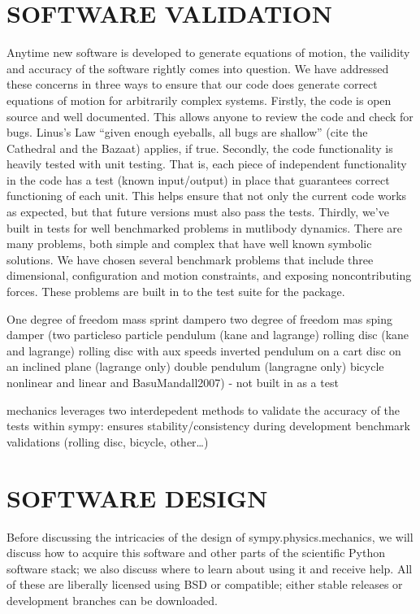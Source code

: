 \documentclass[twocolumn,10pt]{asme2e}
\begin{document}
\section*{SOFTWARE VALIDATION}
Anytime new software is developed to generate equations of motion, the
vailidity and accuracy of the software rightly comes into question. We have
addressed these concerns in three ways to ensure that our code does generate
correct equations of motion for arbitrarily complex systems. Firstly, the code
is open source and well documented. This allows anyone to review the code and
check for bugs. Linus's Law ``given enough eyeballs, all bugs
are shallow'' (cite the Cathedral and the Bazaat) applies, if true.
Secondly, the code functionality is heavily tested with unit testing.  That is,
each piece of independent functionality in the code has a test (known
input/output) in place that guarantees correct functioning of each unit. This
helps ensure that not only the current code works as expected, but that future
versions must also pass the tests. Thirdly, we've built in tests for well
benchmarked problems in mutlibody dynamics. There are many problems, both
simple and complex that have well known symbolic solutions. We have chosen
several benchmark problems that include three dimensional, configuration and
motion constraints, and exposing noncontributing forces. These problems are
built in to the test suite for the package.

One degree of freedom mass sprint dampero
two degree of freedom mas sping damper (two particleso
particle pendulum (kane and lagrange)
rolling disc (kane and lagrange)
rolling disc with aux speeds
inverted pendulum on a cart
disc on an inclined plane (lagrange only)
double pendulum (langragne only)
bicycle nonlinear and linear \cite{Meijaard2007} and BasuMandall2007) - not built in as a test

mechanics leverages two interdepedent methods to validate the accuracy of the
tests within sympy: ensures stability/consistency during development
benchmark validations (rolling disc, bicycle, other\ldots)

\section*{SOFTWARE DESIGN}
Before discussing the intricacies of the design of sympy.physics.mechanics, we
will discuss how to acquire this software and other parts of the scientific
Python software stack; we also discuss where to learn about using it and
receive help.
All of these are liberally licensed using BSD or compatible; either stable
releases or development branches can be downloaded.
\end{document}
